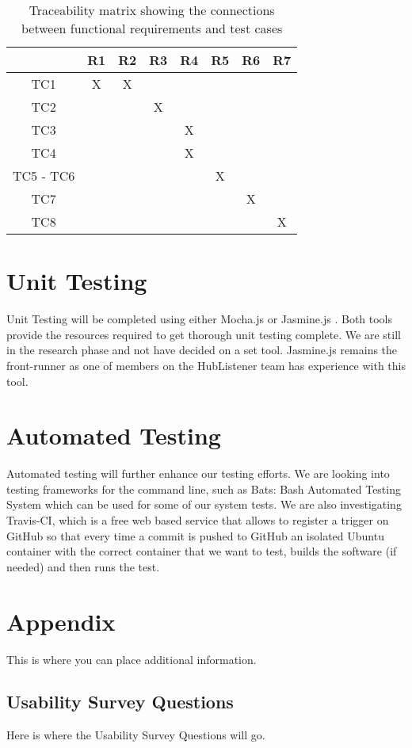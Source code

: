 \documentclass[12pt, titlepage]{article}
\begin{document}
\begin{table}[!h]
\centering
\begin{tabular}{|c|c|c|c|c|c|c|c|}
\hline
          & R1 & R2 & R3 & R4 & R5 & R6 & R7 \\ \hline
TC1       & X  & X  &    &    &    &    &    \\ \hline
TC2       &    &    & X  &    &    &    &    \\ \hline
TC3       &    &    &    & X  &    &    &    \\ \hline
TC4       &    &    &    & X  &    &    &    \\ \hline
TC5 - TC6 &    &    &    &    & X  &    &    \\ \hline
TC7       &    &    &    &    &    & X  &    \\ \hline
TC8       &    &    &    &    &    &    & X \\ \hline
\end{tabular}
\caption{Traceability matrix showing the connections between functional requirements and test cases}
\end{table}

\section{Unit Testing}

Unit Testing will  be completed using either Mocha.js or Jasmine.js . Both tools provide the resources required to get thorough unit testing complete. We are still in the research phase and not have decided on a set tool. Jasmine.js remains the front-runner as one of members on the HubListener team has experience with this tool. 


\section{Automated Testing}

Automated testing will further enhance our testing efforts. We are looking into testing frameworks for the command line, such as Bats: Bash Automated Testing System which can be used for some of our system tests. We are also investigating Travis-CI, which is a free web based service that allows to register a trigger on GitHub so that every time a commit is pushed to GitHub an isolated Ubuntu container with the correct container that we want to test, builds the software (if needed) and then runs the test.


\section{Appendix}

This is where you can place additional information.

\subsection{Usability Survey Questions}
Here is where the Usability Survey Questions will go. 




\end{document}
